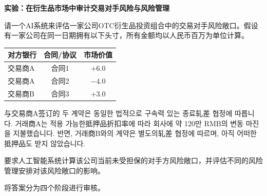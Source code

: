 





\textbf{实验：在衍生品市场中审计交易对手风险与风险管理}

请一个AI系统来评估一家公司OTC衍生品投资组合中的交易对手风险敞口。假设有一家公司在同一日期拥有以下头寸，所有金额均以人民币百万为单位计算。

\begin{center}
\begin{tabular}{lcc}
\toprule
\textbf{对方银行}
& \textbf{合同/协议}
& \textbf{市场价值} \\
\midrule
交易商A & 合同1 & $+6.0$ \\
交易商A & 合同2 & $-4.0$ \\
交易商B & 合同3 & $+3.0$ \\
\bottomrule
\end{tabular}
\end{center}

与交易商A签订的 두 계약은 동일한 법적으로 구속력 있는 종료轧差 협정에 따릅니다. 거래商A는 적용 가능한抵押品折扣率에 따라 회사에 약 120만 RMB의 변동 마진을 지불했습니다. 반면, 거래商B와의 계약은 별도의轧差 협정에 따르며, 아직 어떠한抵押品도 받지 않았습니다.

要求人工智能系统计算该公司当前未受担保的对手方风险敞口，并评估不同的风险管理安排对该风险敞口的影响。

将答案分为四个阶段进行审核。

